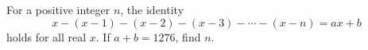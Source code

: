 For a positive integer $n$, the identity
\[
x-(x-1)-(x-2)-(x-3)-\cdots-(x-n)=ax+b
\]
holds for all real $x$. If $a+b=1276$, find $n$.
